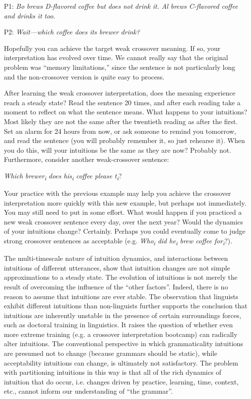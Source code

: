 P1: \textit{Bo brews D-flavored coffee but does not drink it. Al brews C-flavored coffee and drinks it too.} 

P2: \textit{Wait—which coffee does its brewer drink?}

  Hopefully you can achieve the target weak crossover meaning. If so, your interpretation has evolved over time. We cannot really say that the original problem was “memory limitations,” since the sentence is not particularly long and the non-crossover version is quite easy to process. 

  After learning the weak crossover interpretation, does the meaning experience reach a steady state? Read the sentence 20 times, and after each reading take a moment to reflect on what the sentence means. What happens to your intuitions? Most likely they are not the same after the twentieth reading as after the first. Set an alarm for 24 hours from now, or ask someone to remind you tomorrow, and read the sentence (you will probably remember it, so just rehearse it). When you do this, will your intuitions be the same as they are now? Probably not. Furthermore, consider another weak-crossover sentence: 

    \textit{Which brewer\textsubscript{i} does his\textsubscript{i} coffee please t\textsubscript{i}}?

  Your practice with the previous example may help you achieve the crossover interpretation more quickly with this new example, but perhaps not immediately. You may still need to put in some effort. What would happen if you practiced a new weak crossover sentence every day, over the next year? Would the dynamics of your intuitions change? Certainly. Perhaps you could eventually come to judge strong crossover sentences as acceptable (e.g. \textit{Who\textsubscript{i} did he\textsubscript{i} brew coffee for\textsubscript{i}}?). 

  The multi-timescale nature of intuition dynamics, and interactions between intuitions of different utterances, show that intuition changes are not simple approximations to a steady state. The evolution of intuitions is not merely the result of overcoming the influence of the “other factors”. Indeed, there is no reason to assume that intuitions are ever stable. The observation that linguists exhibit different intuitions than non-linguists \citep{Spencer1973} further supports the conclusion that intuitions are inherently unstable in the presence of certain surroundings forces, such as doctoral training in linguistics. It raises the question of whether even more extreme training (e.g. a crossover interpretation bootcamp) can radically alter intuitions. The conventional perspective in which grammaticality intuitions are presumed not to change (because grammars should be static), while acceptability intuitions can change, is ultimately not satisfactory. The problem with partitioning intuitions in this way is that all of the rich dynamics of intuition that do occur, i.e. changes driven by practice, learning, time, context, etc., cannot inform our understanding of “the grammar”.

